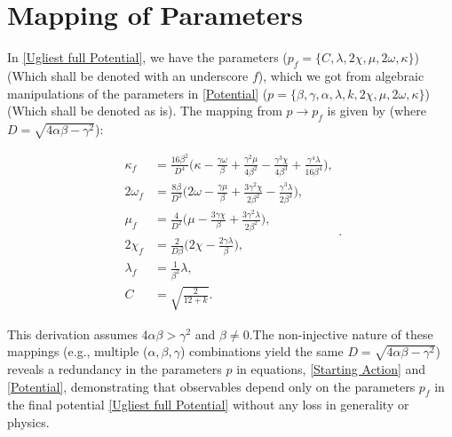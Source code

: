 \documentclass[aps,prd,reprint,preprintnumbers,showpacs,floatfix,nofootinbib,superscript address]{revtex4-2}
\begin{document}
\section{Mapping of Parameters} \label{Mapping of Parameters}
In \cref{Ugliest full Potential}, we have the parameters ($p_f = \{C,\lambda, 2\chi, \mu, 2\omega,  \kappa \}$) (Which shall be denoted with an underscore $f$), which we got from algebraic manipulations of the parameters in \cref{Potential} ($p = \{\beta,\gamma,\alpha,\lambda, k, 2\chi, \mu, 2\omega,  \kappa \}$) (Which shall be denoted as is). The mapping from $p \rightarrow p_f$ is given by (where $D = \sqrt{4\alpha \beta- \gamma^2}$):

\begin{subequations}
    \begin{align}
        \kappa_f &= \frac{16\beta^2}{D^4}\Big(\kappa - \frac{\gamma\omega}{\beta} + \frac{\gamma^2\mu}{4\beta^2} - \frac{\gamma^3\chi}{4\beta^3} +\frac{\gamma^4\lambda}{16\beta^4} \Big), \\
        2\omega_f &= \frac{8\beta}{D^3} \Big(2\omega - \frac{\gamma\mu}{\beta} + \frac{3\gamma^2\chi}{2\beta^2} - \frac{\gamma^3\lambda}{2\beta^3}\Big),    \\
        \mu_f &= \frac{4}{D^2} \Big(\mu - \frac{3\gamma\chi}{\beta} + \frac{3\gamma^2\lambda}{2\beta^2} \Big),  \\
        2\chi_f &= \frac{2}{D\beta} \Big(2\chi - \frac{2\gamma\lambda}{\beta}\Big),  \\
        \lambda_f &= \frac{1}{\beta^2}\lambda , \\
        C &= \sqrt{\frac{2}{12+k}}.
    \end{align}.    
\end{subequations}

This derivation assumes $4\alpha\beta > \gamma^2$ and $\beta \neq 0. $The non-injective nature of these mappings (e.g., multiple ($\alpha,\beta,\gamma$) combinations yield the same $D = \sqrt{4\alpha\beta - \gamma^2}$) reveals a redundancy in the parameters $p$ in equations, \cref{Starting Action} and \cref{Potential}, demonstrating that observables depend only on the parameters $p_f$ in the final potential \cref{Ugliest full Potential} without any loss in generality or physics. 



\newpage
\,
\newpage

\printbibliography
\end{document}
